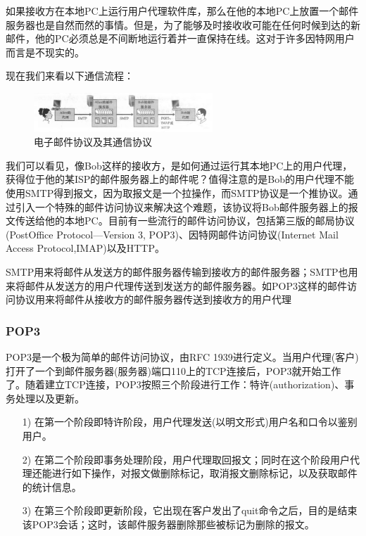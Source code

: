     如果接收方在本地PC上运行用户代理软件库，那么在他的本地PC上放置一个邮件服务器也是自然而然的事情。但是，为了能够及时接收收可能在任何时候到达的新邮件，他的PC必须总是不间断地运行着并一直保持在线。这对于许多因特网用户而言是不现实的。

    现在我们来看以下通信流程：

\begin{figure}[!htbp]
    \centering
    \includegraphics[width=0.6\textwidth]{image/chapter02/SMTP路径.png}
    \caption{电子邮件协议及其通信协议}
\end{figure}

    我们可以看见，像Bob这样的接收方，是如何通过运行其本地PC上的用户代理，获得位于他的某ISP的邮件服务器上的邮件呢？值得注意的是Bob的用户代理不能使用SMTP得到报文，因为取报文是一个拉操作，而SMTP协议是一个推协议。通过引入一个特殊的邮件访问协议来解决这个难题，该协议将Bob邮件服务器上的报文传送给他的本地PC。目前有一些流行的邮件访问协议，包括第三版的邮局协议(PostOffice Protocol—Version 3, POP3)、因特网邮件访问协议(Internet Mail Access Protocol,IMAP)以及HTTP。

    SMTP用来将邮件从发送方的邮件服务器传输到接收方的邮件服务器；SMTP也用来将邮件从发送方的用户代理传送到发送方的邮件服务器。如POP3这样的邮件访问协议用来将邮件从接收方的邮件服务器传送到接收方的用户代理

\subsubsection{POP3}

    POP3是一个极为简单的邮件访问协议，由RFC 1939进行定义。当用户代理(客户)打开了一个到邮件服务器(服务器)端口110上的TCP连接后，POP3就开始工作了。随着建立TCP连接，POP3按照三个阶段进行工作：特许(authorization)、事务处理以及更新。

\begin{itemize}
    \item [1)] 在第一个阶段即特许阶段，用户代理发送(以明文形式)用户名和口令以鉴别用户。
    \item [2)] 在第二个阶段即事务处理阶段，用户代理取回报文；同时在这个阶段用户代理还能进行如下操作，对报文做删除标记，取消报文删除标记，以及获取邮件的统计信息。
    \item [3)] 在第三个阶段即更新阶段，它出现在客户发出了quit命令之后，目的是结束该POP3会话；这时，该邮件服务器删除那些被标记为删除的报文。
\end{itemize}

